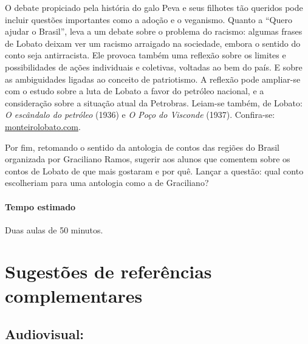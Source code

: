 \documentclass[11pt]{extarticle}
\begin{document}
O debate propiciado pela história do galo Peva e seus filhotes tão
queridos pode incluir questões importantes como a adoção e o veganismo.
Quanto a ``Quero ajudar o Brasil'', leva a um debate sobre o problema do
racismo: algumas frases de Lobato deixam ver um racismo arraigado na
sociedade, embora o sentido do conto seja antirracista. Ele provoca
também uma reflexão sobre os limites e possibilidades de ações
individuais e coletivas, voltadas ao bem do país. E sobre as
ambiguidades ligadas ao conceito de patriotismo. A reflexão pode
ampliar-se com o estudo sobre a luta de Lobato a favor do petróleo
nacional, e a consideração sobre a situação atual da Petrobras. Leiam-se
também, de \textbar{}Lobato: \emph{O escândalo do petróleo} (1936) e
\emph{O Poço do Visconde} (1937). Confira-se:
\href{http://www.monteirolobato.com/linha-do-tempo/1931-1939-a-luta-de-lobato-pelo-petroleo-e-ferro}%
{monteirolobato.com}.

Por fim, retomando o sentido da antologia de contos das regiões do
Brasil organizada por Graciliano Ramos, sugerir aos alunos que comentem
sobre os contos de Lobato de que mais gostaram e por quê. Lançar a
questão: qual conto escolheriam para uma antologia como a de Graciliano?

\paragraph{Tempo estimado} Duas aulas de 50 minutos.



\section{Sugestões de referências complementares}

\subsection{Audiovisual:}
\end{document}
